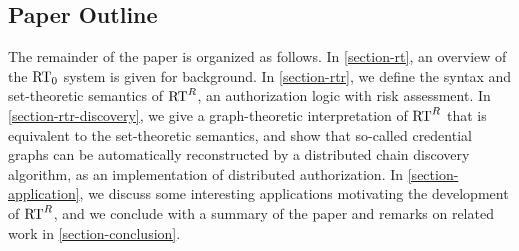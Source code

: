 \subsection{Paper Outline}

The remainder of the paper is organized as follows. In
\autoref{section-rt}, an overview of the $\text{RT}_0$ system is given for
background.  In \autoref{section-rtr}, we define the syntax and
set-theoretic semantics of $\text{RT}^R$, an authorization logic with risk
assessment.  In \autoref{section-rtr-discovery}, we give a
graph-theoretic interpretation of $\text{RT}^R$ that is equivalent to the
set-theoretic semantics, and show that so-called credential graphs can
be automatically reconstructed by a distributed chain discovery
algorithm, as an implementation of distributed authorization.  In
\autoref{section-application}, we discuss some interesting
applications motivating the development of $\text{RT}^R$, and we conclude
with a summary of the paper and remarks on related work in
\autoref{section-conclusion}.
